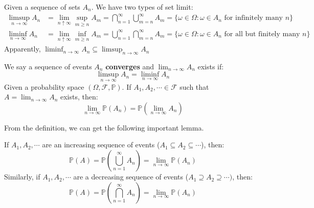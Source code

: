 \documentclass{huhtakm-template-book}
\newcommand{\prob}{\mathbb{P}}
\begin{document}
    \begin{rem} 
    Given a sequence of sets $A_{n}$. We have two types of set limit:
        \begin{align*}
            \limsup_{n\to\infty}A_{n}&=\lim_{n\uparrow\infty}\sup_{m\geq n}A_{m}=\bigcap_{n=1}^{\infty}\bigcup_{m=n}^{\infty}A_{m}=\{\omega\in\Omega:\omega\in A_{n}\text{ for infinitely many }n\}\\
            \liminf_{n\to\infty}A_{n}&=\lim_{n\uparrow\infty}\inf_{m\geq n}A_{m}=\bigcup_{n=1}^{\infty}\bigcap_{m=n}^{\infty}A_{m}=\{\omega\in\Omega: \omega\in A_{n}\text{ for all but finitely many }n\}
        \end{align*}
        Apparently, $\liminf_{n\to\infty}A_{n}\subseteq\limsup_{n\to\infty}A_{n}$
    \end{rem}
    \begin{defn}
        We say a sequence of events $A_{n}$ \textbf{converges} and $\lim_{n\to\infty}A_{n}$ exists if:
        \begin{equation*}
            \limsup_{n\to\infty}A_{n}=\liminf_{n\to\infty}A_{n}
        \end{equation*}
        Given a probability space $(\Omega,\mathcal{F},\prob)$. If $A_{1},A_{2},\cdots\in\mathcal{F}$ such that $A=\lim_{n\to\infty}A_{n}$ exists, then:
        \begin{equation*}
            \lim_{n\to\infty}\prob(A_{n})=\prob\left(\lim_{n\to\infty}A_{n}\right)
        \end{equation*}
    \end{defn}
    From the definition, we can get the following important lemma.
    \begin{lem}
        \label{Continuous probability}
        If $A_{1},A_{2},\cdots$ are an increasing sequence of events ($A_{1}\subseteq A_{2}\subseteq\cdots$), then:
        \begin{equation*}
            \prob(A)=\prob\left(\bigcup_{n=1}^{\infty}A_{n}\right)=\lim_{n\to\infty}\prob(A_{n})
        \end{equation*}
        Similarly, if $A_{1},A_{2},\cdots$ are a decreasing sequence of events ($A_{1}\supseteq A_{2}\supseteq\cdots)$, then:
        \begin{equation*}
            \prob(A)=\prob\left(\bigcap_{n=1}^{\infty}A_{n}\right)=\lim_{n\to\infty}\prob(A_{n})
        \end{equation*}
    \end{lem}
\end{document}
